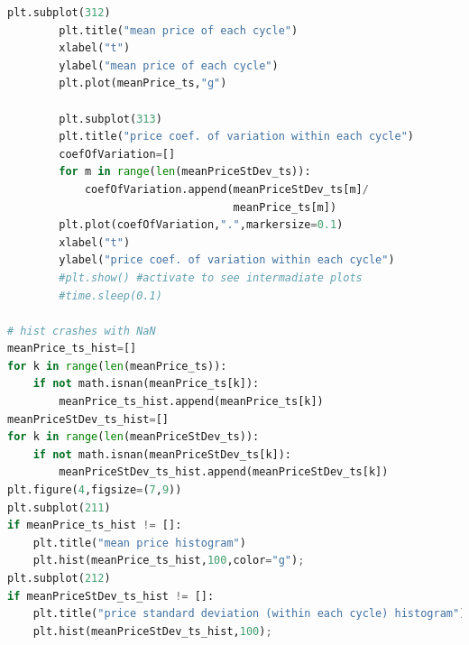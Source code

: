 \documentclass[10pt]{report}
\renewcommand{\thesection}{\arabic{section}} %
\begin{document}
\begin{lstlisting}[language=Python, caption=The unstructured version, basicstyle=\ttfamily\footnotesize]
        plt.subplot(312)
        plt.title("mean price of each cycle")
        xlabel("t")
        ylabel("mean price of each cycle")
        plt.plot(meanPrice_ts,"g")
        
        plt.subplot(313)
        plt.title("price coef. of variation within each cycle")
        coefOfVariation=[]
        for m in range(len(meanPriceStDev_ts)):
            coefOfVariation.append(meanPriceStDev_ts[m]/
                                   meanPrice_ts[m])
        plt.plot(coefOfVariation,".",markersize=0.1)
        xlabel("t")
        ylabel("price coef. of variation within each cycle")
        #plt.show() #activate to see intermadiate plots
        #time.sleep(0.1)

# hist crashes with NaN
meanPrice_ts_hist=[]
for k in range(len(meanPrice_ts)): 
    if not math.isnan(meanPrice_ts[k]):
        meanPrice_ts_hist.append(meanPrice_ts[k])
meanPriceStDev_ts_hist=[]
for k in range(len(meanPriceStDev_ts)): 
    if not math.isnan(meanPriceStDev_ts[k]):
        meanPriceStDev_ts_hist.append(meanPriceStDev_ts[k])
plt.figure(4,figsize=(7,9))
plt.subplot(211)
if meanPrice_ts_hist != []:
    plt.title("mean price histogram")
    plt.hist(meanPrice_ts_hist,100,color="g");
plt.subplot(212)
if meanPriceStDev_ts_hist != []:
    plt.title("price standard deviation (within each cycle) histogram")
    plt.hist(meanPriceStDev_ts_hist,100);
\end{lstlisting}




\renewcommand{\thesubsection}{\thesection.\alph{subsection}}
\renewcommand{\thesection}{\thechapter.\arabic{section}}
\end{document}

